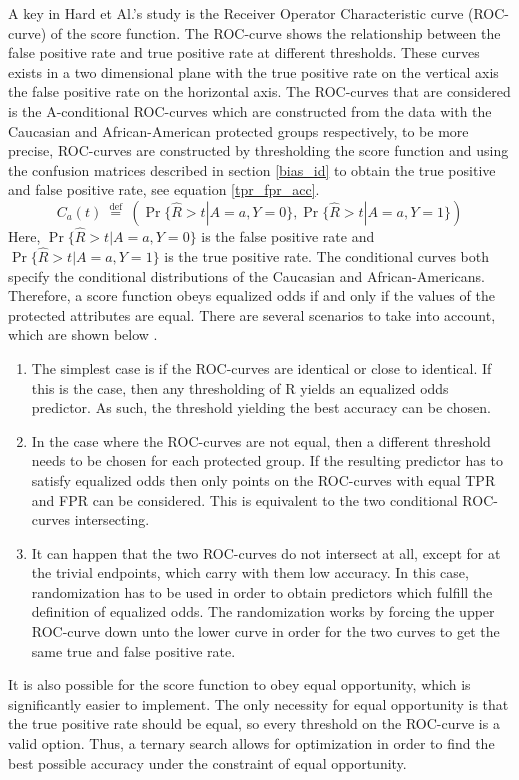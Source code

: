 \documentclass[11pt, fleqn, titlepage]{article}
\begin{document}
	A key in Hard et Al.'s study is the Receiver Operator Characteristic curve (ROC-curve) of the score function. The ROC-curve shows the relationship between the false positive rate and true positive rate at different thresholds. These curves exists in a two dimensional plane with the true positive rate on the vertical axis the false positive rate on the horizontal axis. The ROC-curves that are considered is the A-conditional ROC-curves which are constructed from the data with the Caucasian and African-American protected groups respectively, to be more precise, ROC-curves are constructed by thresholding the score function and using the confusion matrices described in section \ref{bias_id} to obtain the true positive and false positive rate, see equation \ref{tpr_fpr_acc}.
	\begin{equation*}\label{key}
	C_{a}(t) \stackrel{\text { def }}{=}(\operatorname{Pr}\{\widehat{R}>t | A=a, Y=0\}, \operatorname{Pr}\{\widehat{R}>t | A=a, Y=1\})
	\end{equation*}
	Here, $ \operatorname{Pr}\{\widehat{R}>t | A=a, Y=0\} $ is the false positive rate and $ \operatorname{Pr}\{\widehat{R}>t | A=a, Y=1\} $ is the true positive rate. The conditional curves both specify the conditional distributions of the Caucasian and African-Americans. Therefore, a score function obeys equalized odds if and only if the values of the protected attributes are equal. There are several scenarios to take into account, which are shown below \cite{equal_of_oppor}.
	\begin{enumerate}
		\item The simplest case is if the ROC-curves are identical or close to identical. If this is the case, then any thresholding of R yields an equalized odds predictor. As such, the threshold yielding the best accuracy can be chosen.
		\item In the case where the ROC-curves are not equal, then a different threshold needs to be chosen for each protected group. If the resulting predictor has to satisfy equalized odds then only points on the ROC-curves with equal TPR and FPR can be considered. This is equivalent to the two conditional ROC-curves intersecting. 
		\item It can happen that the two ROC-curves do not intersect at all, except for at the trivial endpoints, which carry with them low accuracy. In this case, randomization has to be used in order to obtain predictors which fulfill the definition of equalized odds. The randomization works by forcing the upper ROC-curve down unto the lower curve in order for the two curves to get the same true and false positive rate.
	\end{enumerate}
	It is also possible for the score function to obey equal opportunity, which is significantly easier to implement. The only necessity for equal opportunity is that the true positive rate should be equal, so every threshold on the ROC-curve is a valid option. Thus, a ternary search allows for optimization in order to find the best possible accuracy under the constraint of equal opportunity.
	
\end{document}
